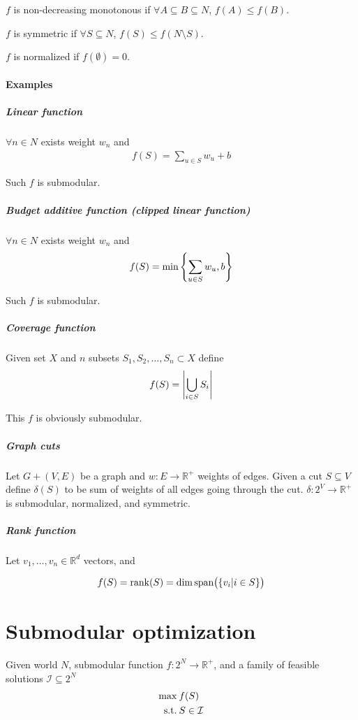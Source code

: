 \begin{definition}
	$f$ is non-decreasing monotonous if $\forall A\subseteq B \subseteq N$, $f(A) \leq f(B)$.
\end{definition}

\begin{definition}
	$f$ is symmetric if $\forall S \subseteq N$, $f(S) \leq f(N\setminus S)$.
\end{definition}
\begin{definition}
$f$ is normalized if $f(\emptyset) = 0$.
\end{definition}

\paragraph{Examples}
\subparagraph{Linear function}
$\forall n\in N$ exists weight $w_n$ and 
\begin{align}
f(S) = \sum_{u \in S} w_u + b
\end{align} 

Such $f$ is submodular.
\subparagraph{Budget additive function (clipped linear function)}
$\forall n\in N$ exists weight $w_n$ and 
\begin{align}
f(S) = \min \qty{ \sum_{u \in S} w_u,  b }
\end{align} 

Such $f$ is submodular.

\subparagraph{Coverage function}
Given set $X$ and $n$ subsets $S_1, S_2, \dots, S_n \subset X$ define
\begin{align}
f(S) = \abs{\bigcup_{i \in S} S_i}
\end{align}

This $f$ is obviously submodular.

\subparagraph{Graph cuts}
Let $G+(V,E)$ be a graph and $w: E\to \mathbb{R}^+$ weights of edges. Given a cut $S\subseteq V$ define $\delta(S)$ to be sum of weights of all edges going through the cut. $\delta : 2^V \to \mathbb{R}^+$ is submodular, normalized, and symmetric.


\subparagraph{Rank function}
Let $v_1, \dots, v_n \in \mathbb{R}^d$ vectors, and 

\begin{align}
f(S) = \rank (S) = \dim \text{span} \qty\big( \qty{ v_i | i \in S} )
\end{align}


\section{Submodular optimization}
Given world $N$, submodular function $f: 2^N \to \mathbb{R}^+$, and a family of feasible solutions $\mathcal{I} \subseteq 2^N$
\begin{align}
\max \:& f(S)\\
\text{s.t.} \: & S\in \mathcal{I}
\end{align}


